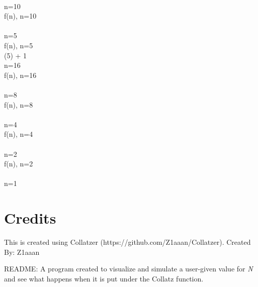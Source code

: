 \documentclass{article}
\begin{document}
 \Rightarrow {} 
 \\ 
 \Rightarrow n=10
 \\[3mm] 
f(n), n=10
 \\ 
 \Rightarrow {} 
 \\ 
 \Rightarrow n=5
 \\[3mm] 
f(n), n=5
 \\ 
 (5) + 1
 \\ 
 \Rightarrow n=16
 \\[3mm] 
f(n), n=16
 \\ 
 \Rightarrow {} 
 \\ 
 \Rightarrow n=8
 \\[3mm] 
f(n), n=8
 \\ 
 \Rightarrow {} 
 \\ 
 \Rightarrow n=4
 \\[3mm] 
f(n), n=4
 \\ 
 \Rightarrow {} 
 \\ 
 \Rightarrow n=2
 \\[3mm] 
f(n), n=2
 \\ 
 \Rightarrow {} 
 \\ 
 \Rightarrow n=1
 \\[3mm] 

    \section{Credits}
    This is created using Collatzer (https://github.com/Z1aaan/Collatzer).
    Created By: Z1aaan
    
    README:
    A program created to visualize and simulate a user-given value for \textit{N} 
    and see what happens when it is put under the Collatz function.
    
\end{document}
